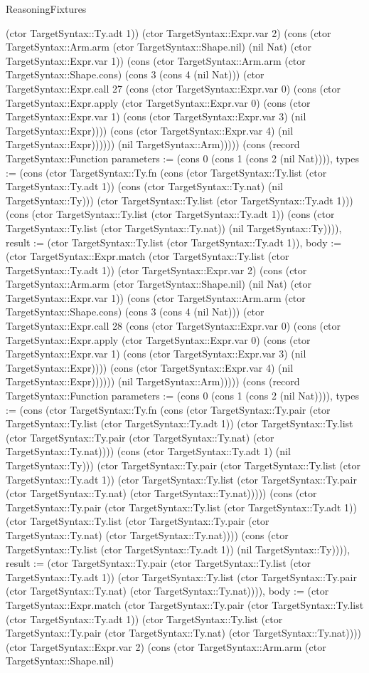\begin{lexlean}{ReasoningFixtures}
\begin{semanticmodule}
{(ctor TargetSyntax::Ty.adt 1)) (ctor TargetSyntax::Expr.var 2) (cons (ctor TargetSyntax::Arm.arm (ctor TargetSyntax::Shape.nil) (nil Nat) (ctor TargetSyntax::Expr.var 1)) (cons (ctor TargetSyntax::Arm.arm (ctor TargetSyntax::Shape.cons) (cons 3 (cons 4 (nil Nat))) (ctor TargetSyntax::Expr.call 27 (cons (ctor TargetSyntax::Expr.var 0) (cons (ctor TargetSyntax::Expr.apply (ctor TargetSyntax::Expr.var 0) (cons (ctor TargetSyntax::Expr.var 1) (cons (ctor TargetSyntax::Expr.var 3) (nil TargetSyntax::Expr)))) (cons (ctor TargetSyntax::Expr.var 4) (nil TargetSyntax::Expr)))))) (nil TargetSyntax::Arm))))}) (cons (record TargetSyntax::Function {parameters := (cons 0 (cons 1 (cons 2 (nil Nat)))), types := (cons (ctor TargetSyntax::Ty.fn (cons (ctor TargetSyntax::Ty.list (ctor TargetSyntax::Ty.adt 1)) (cons (ctor TargetSyntax::Ty.nat) (nil TargetSyntax::Ty))) (ctor TargetSyntax::Ty.list (ctor TargetSyntax::Ty.adt 1))) (cons (ctor TargetSyntax::Ty.list (ctor TargetSyntax::Ty.adt 1)) (cons (ctor TargetSyntax::Ty.list (ctor TargetSyntax::Ty.nat)) (nil TargetSyntax::Ty)))), result := (ctor TargetSyntax::Ty.list (ctor TargetSyntax::Ty.adt 1)), body := (ctor TargetSyntax::Expr.match (ctor TargetSyntax::Ty.list (ctor TargetSyntax::Ty.adt 1)) (ctor TargetSyntax::Expr.var 2) (cons (ctor TargetSyntax::Arm.arm (ctor TargetSyntax::Shape.nil) (nil Nat) (ctor TargetSyntax::Expr.var 1)) (cons (ctor TargetSyntax::Arm.arm (ctor TargetSyntax::Shape.cons) (cons 3 (cons 4 (nil Nat))) (ctor TargetSyntax::Expr.call 28 (cons (ctor TargetSyntax::Expr.var 0) (cons (ctor TargetSyntax::Expr.apply (ctor TargetSyntax::Expr.var 0) (cons (ctor TargetSyntax::Expr.var 1) (cons (ctor TargetSyntax::Expr.var 3) (nil TargetSyntax::Expr)))) (cons (ctor TargetSyntax::Expr.var 4) (nil TargetSyntax::Expr)))))) (nil TargetSyntax::Arm))))}) (cons (record TargetSyntax::Function {parameters := (cons 0 (cons 1 (cons 2 (nil Nat)))), types := (cons (ctor TargetSyntax::Ty.fn (cons (ctor TargetSyntax::Ty.pair (ctor TargetSyntax::Ty.list (ctor TargetSyntax::Ty.adt 1)) (ctor TargetSyntax::Ty.list (ctor TargetSyntax::Ty.pair (ctor TargetSyntax::Ty.nat) (ctor TargetSyntax::Ty.nat)))) (cons (ctor TargetSyntax::Ty.adt 1) (nil TargetSyntax::Ty))) (ctor TargetSyntax::Ty.pair (ctor TargetSyntax::Ty.list (ctor TargetSyntax::Ty.adt 1)) (ctor TargetSyntax::Ty.list (ctor TargetSyntax::Ty.pair (ctor TargetSyntax::Ty.nat) (ctor TargetSyntax::Ty.nat))))) (cons (ctor TargetSyntax::Ty.pair (ctor TargetSyntax::Ty.list (ctor TargetSyntax::Ty.adt 1)) (ctor TargetSyntax::Ty.list (ctor TargetSyntax::Ty.pair (ctor TargetSyntax::Ty.nat) (ctor TargetSyntax::Ty.nat)))) (cons (ctor TargetSyntax::Ty.list (ctor TargetSyntax::Ty.adt 1)) (nil TargetSyntax::Ty)))), result := (ctor TargetSyntax::Ty.pair (ctor TargetSyntax::Ty.list (ctor TargetSyntax::Ty.adt 1)) (ctor TargetSyntax::Ty.list (ctor TargetSyntax::Ty.pair (ctor TargetSyntax::Ty.nat) (ctor TargetSyntax::Ty.nat)))), body := (ctor TargetSyntax::Expr.match (ctor TargetSyntax::Ty.pair (ctor TargetSyntax::Ty.list (ctor TargetSyntax::Ty.adt 1)) (ctor TargetSyntax::Ty.list (ctor TargetSyntax::Ty.pair (ctor TargetSyntax::Ty.nat) (ctor TargetSyntax::Ty.nat)))) (ctor TargetSyntax::Expr.var 2) (cons (ctor TargetSyntax::Arm.arm (ctor TargetSyntax::Shape.nil) }
\end{semanticmodule}
\end{lexlean}
